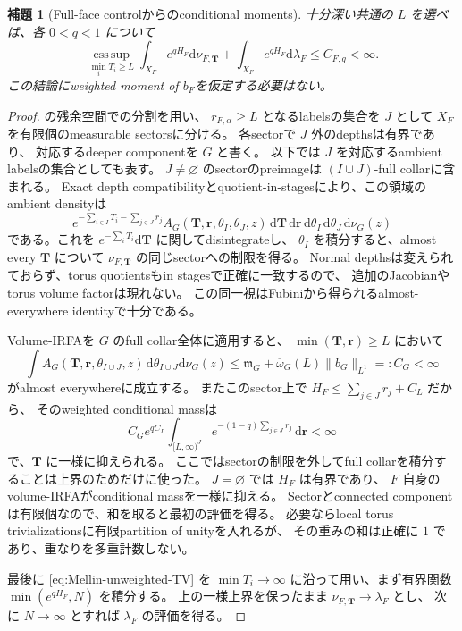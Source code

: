 \documentclass[11pt,a4paper]{ltjsarticle}
\newcommand{\dd}{\mathrm d}
\theoremstyle{plain}
\newtheorem{lemma}[lemma]{補題}
\theoremstyle{definition}
\theoremstyle{remark}
\begin{document}
\begin{lemma}[Full-face controlからのconditional moments]
\label{lem:Mellin-conditional-moments}
十分深い共通の $L$ を選べば、各 $0<q<1$ について
\[
 \operatorname*{ess\,sup}_{\min_iT_i\ge L}
       \int_{X_F}e^{qH_F}\dd\nu_{F,\bm T}
 +\int_{X_F}e^{qH_F}\dd\lambda_F
 \le C_{F,q}<\infty.
\]
この結論にweighted moment of $b_F$を仮定する必要はない。
\end{lemma}
\begin{proof}
 の残余空間での分割を用い、
$r_{F,\alpha}\ge L$ となるlabelsの集合を $J$ として
$X_F$ を有限個のmeasurable sectorsに分ける。
各sectorで $J$ 外のdepthsは有界であり、
対応するdeeper componentを $G$ と書く。
以下では $J$ を対応するambient labelsの集合としても表す。
$J\ne\varnothing$ のsectorのpreimageは
$(I\cup J)$-full collarに含まれる。
Exact depth compatibilityとquotient-in-stagesにより、この領域のambient densityは
\[
 e^{-\sum_{i\in I}T_i-\sum_{j\in J}r_j}
 A_G(\bm T,\bm r,\theta_I,\theta_J,z)\,
 \dd\bm T\,\dd\bm r\,\dd\theta_I\,\dd\theta_J\,\dd\nu_G(z)
\]
である。これを $e^{-\sum_iT_i}\dd\bm T$ に関してdisintegrateし、
$\theta_I$ を積分すると、almost every $\bm T$ について
$\nu_{F,\bm T}$ の同じsectorへの制限を得る。
Normal depthsは変えられておらず、torus quotientsもin stagesで正確に一致するので、
追加のJacobianやtorus volume factorは現れない。
この同一視はFubiniから得られるalmost-everywhere identityで十分である。

Volume-IRFAを $G$ のfull collar全体に適用すると、
$\min(\bm T,\bm r)\ge L$ において
\[
 \int A_G(\bm T,\bm r,\theta_{I\cup J},z)\,
          \dd\theta_{I\cup J}\dd\nu_G(z)
 \le\mathfrak m_G+\overline\omega_G(L)\|b_G\|_{L^1}
 =:C_G<\infty
\]
がalmost everywhereに成立する。
またこのsector上で $H_F\le\sum_{j\in J}r_j+C_L$ だから、
そのweighted conditional massは
\[
 C_Ge^{qC_L}
 \int_{[L,\infty)^J}e^{-(1-q)\sum_{j\in J}r_j}\,\dd\bm r<\infty
\]
で、$\bm T$ に一様に抑えられる。
ここではsectorの制限を外してfull collarを積分することは上界のためだけに使った。
$J=\varnothing$ では $H_F$ は有界であり、
$F$ 自身のvolume-IRFAがconditional massを一様に抑える。
Sectorとconnected componentは有限個なので、和を取ると最初の評価を得る。
必要ならlocal torus trivializationsに有限partition of unityを入れるが、
その重みの和は正確に $1$ であり、重なりを多重計数しない。

最後に \eqref{eq:Mellin-unweighted-TV} を
$\min T_i\to\infty$ に沿って用い、まず有界関数
$\min(e^{qH_F},N)$ を積分する。
上の一様上界を保ったまま $\nu_{F,\bm T}\to\lambda_F$ とし、
次に $N\to\infty$ とすれば $\lambda_F$ の評価を得る。
\end{proof}
\end{document}
